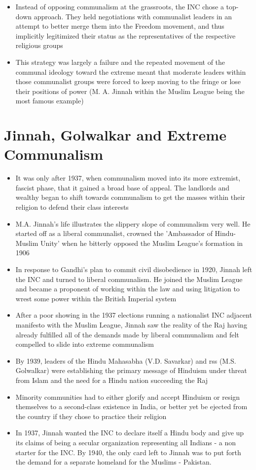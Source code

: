 \begin{itemize}
    \item Instead of opposing communalism at the grassroots, the INC chose a top-down approach. They held negotiations with communalist leaders in an attempt to better merge them into the Freedom movement, and thus implicitly legitimized their status as the representatives of the respective religious groups
    \item This strategy was largely a failure and the repeated movement of the communal ideology toward the extreme meant that moderate leaders within those communalist groups were forced to keep moving to the fringe or lose their positions of power (M. A. Jinnah within the Muslim League being the most famous example)
\end{itemize}

\section{Jinnah, Golwalkar and Extreme Communalism}
\begin{itemize}
    \item It was only after 1937, when communalism moved into its more extremist, fascist phase, that it gained a broad base of appeal. The landlords and wealthy began to shift towards communalism to get the masses within their religion to defend their class interests
    \item M.A. Jinnah's life illustrates the slippery slope of communalism very well. He started off as a liberal communalist, crowned the 'Ambassador of Hindu-Muslim Unity' when he bitterly opposed the Muslim League's formation in 1906
    \item In response to Gandhi's plan to commit civil disobedience in 1920, Jinnah left the INC and turned to liberal communalism. He joined the Muslim League and became a proponent of working within the law and using litigation to wrest some power within the British Imperial system
    \item After a poor showing in the 1937 elections running a nationalist INC adjacent manifesto with the Muslim League, Jinnah saw the reality of the Raj having already fulfilled all of the demands made by liberal communalism and felt compelled to slide into extreme communalism
    \item By 1939, leaders of the Hindu Mahasabha (V.D. Savarkar) and \acrshort{rss} (M.S. Golwalkar) were establishing the primary message of Hinduism under threat from Islam and the need for a Hindu nation succeeding the Raj
    \item Minority communities had to either glorify and accept Hinduism or resign themselves to a second-class existence in India, or better yet be ejected from the country if they chose to practice their religion
    \item In 1937, Jinnah wanted the INC to declare itself a Hindu body and give up its claims of being a secular organization representing all Indians - a non starter for the INC. By 1940, the only card left to Jinnah was to put forth the demand for a separate homeland for the Muslims - Pakistan.
\end{itemize}

